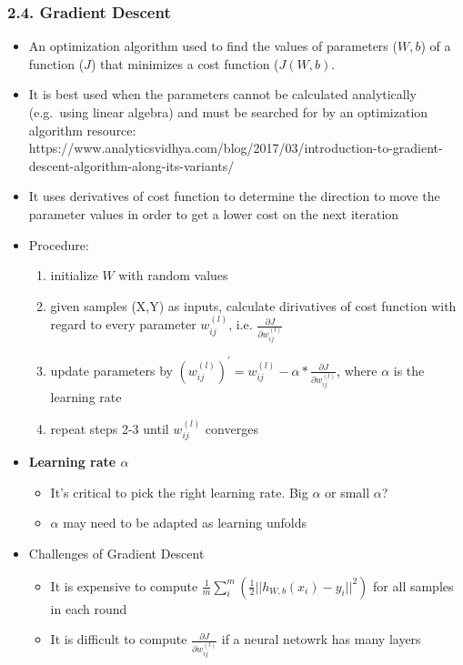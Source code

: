 \documentclass[11pt]{article}
\providecommand{\tightlist}{%
      \setlength{\itemsep}{0pt}\setlength{\parskip}{0pt}}
\begin{document}
    \hypertarget{gradient-descent}{%
\subsubsection{2.4. Gradient Descent}\label{gradient-descent}}

\begin{itemize}
\tightlist
\item
  An optimization algorithm used to find the values of parameters
  (\(W, b\)) of a function (\(J\)) that minimizes a cost function
  (\(J(W,b)\).
\item
  It is best used when the parameters cannot be calculated analytically
  (e.g.~using linear algebra) and must be searched for by an
  optimization algorithm resource:
  https://www.analyticsvidhya.com/blog/2017/03/introduction-to-gradient-descent-algorithm-along-its-variants/
\item
  It uses derivatives of cost function to determine the direction to
  move the parameter values in order to get a lower cost on the next
  iteration
\item
  Procedure:

  \begin{enumerate}
  \def\labelenumi{\arabic{enumi}.}
  \tightlist
  \item
    initialize \(W\) with random values
  \item
    given samples (X,Y) as inputs, calculate dirivatives of cost
    function with regard to every parameter \(w_{ij}^{(l)}\), i.e.
    \(\frac{\partial{J}}{\partial{w_{ij}^{(l)}}}\)
  \item
    update parameters by
    \((w_{ij}^{(l)})^{'}=w_{ij}^{(l)}-\alpha*\frac{\partial{J}}{\partial{w_{ij}^{(l)}}}\),
    where \(\alpha\) is the learning rate
  \item
    repeat steps 2-3 until \(w_{ij}^{(l)}\) converges
  \end{enumerate}
\item
  \textbf{Learning rate \(\alpha\)}

  \begin{itemize}
  \tightlist
  \item
    It's critical to pick the right learning rate. Big \(\alpha\) or
    small \(\alpha\)?
  \item
    \(\alpha\) may need to be adapted as learning unfolds
  \end{itemize}
\item
  Challenges of Gradient Descent

  \begin{itemize}
  \tightlist
  \item
    It is expensive to compute
    \(\frac{1}{m}\sum_i^m{(\frac{1}{2}||h_{W,b}(x_i)-y_i||^2)}\) for all
    samples in each round
  \item
    It is difficult to compute
    \(\frac{\partial{J}}{\partial{w_{ij}^{(l)}}}\) if a neural netowrk
    has many layers
  \end{itemize}
\end{itemize}
\end{document}
